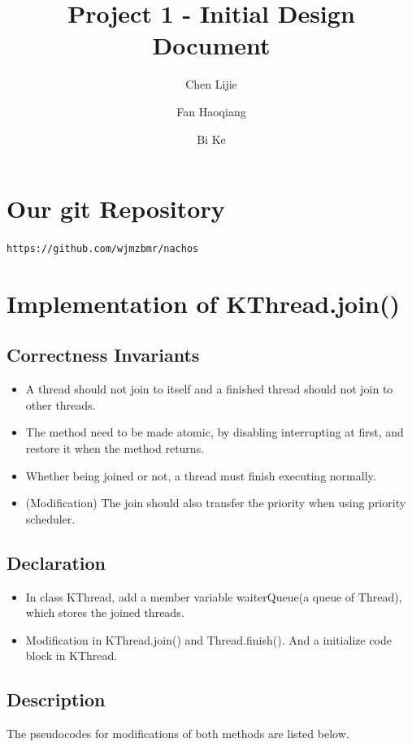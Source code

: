 \documentclass{article}
\title{Project 1 - Initial Design Document}
\author{Chen Lijie\\ \and
	Fan Haoqiang\\ \and
	Bi Ke\\ }
\date{}
\begin{document}
	\maketitle
	\tableofcontents
	\section{Our git Repository}
	\texttt{https://github.com/wjmzbmr/nachos}
	\section{Implementation of KThread.join()}
	
	\subsection{Correctness Invariants}
	
	\begin{itemize}
		\item A thread should not join to itself and a finished thread should not join to other threads.
		\item The method need to be made atomic, by disabling interrupting at first, and restore it when the method returns.
		\item Whether being joined or not, a thread must finish executing normally.
		\item(Modification) The join should also transfer the priority when using priority scheduler.
	\end{itemize}

	\subsection{Declaration}
	\begin{itemize}
		\item In class KThread, add a member variable waiterQueue(a queue of Thread), which stores the joined threads.
		
		\item Modification in KThread.join() and Thread.finish(). And a initialize code block in KThread.
    \end{itemize}
	
	\subsection{Description}
	
	The pseudocodes for modifications of both methods are listed below.
	
\end{document}
